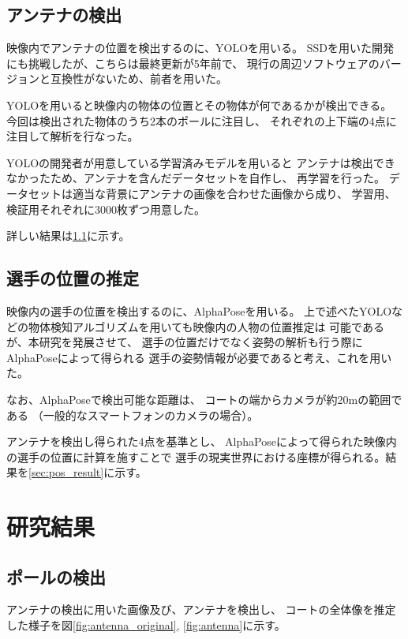 \documentclass[twoside,twocolumn]{jsarticle}
\begin{document}
	\subsection{アンテナの検出}
		映像内でアンテナの位置を検出するのに、YOLO\cite{Redmon}を用いる。
		SSD\cite{Liu}を用いた開発にも挑戦したが、こちらは最終更新が5年前で、
		現行の周辺ソフトウェアのバージョンと互換性がないため、前者を用いた。

		YOLOを用いると映像内の物体の位置とその物体が何であるかが検出できる。
		今回は検出された物体のうち2本のポールに注目し、
		それぞれの上下端の4点に注目して解析を行なった。

		YOLOの開発者が用意している学習済みモデルを用いると
		アンテナは検出できなかったため、アンテナを含んだデータセットを自作し、
		再学習を行った。
		データセットは適当な背景にアンテナの画像を合わせた画像から成り、
		学習用、検証用それぞれに3000枚ずつ用意した。
		
		詳しい結果は\ref{sec:pole_result}に示す。

	\subsection{選手の位置の推定} \label{sec:pos_theory}
		映像内の選手の位置を検出するのに、AlphaPose\cite{Fang}を用いる。
		上で述べたYOLOなどの物体検知アルゴリズムを用いても映像内の人物の位置推定は
		可能であるが、本研究を発展させて、
		選手の位置だけでなく姿勢の解析も行う際にAlphaPoseによって得られる
		選手の姿勢情報が必要であると考え、これを用いた。

		なお、AlphaPoseで検出可能な距離は、
		コートの端からカメラが約20mの範囲である
		（一般的なスマートフォンのカメラの場合）。 

		アンテナを検出し得られた4点を基準とし、
		AlphaPoseによって得られた映像内の選手の位置に計算を施すことで
		選手の現実世界における座標が得られる。結果を\ref{sec:pos_result}に示す。

\section{研究結果}
	\subsection{ポールの検出} \label{sec:pole_result}
		アンテナの検出に用いた画像及び、アンテナを検出し、
		コートの全体像を推定した様子を図\ref{fig:antenna_original},
		\ref{fig:antenna}に示す。
\end{document}
